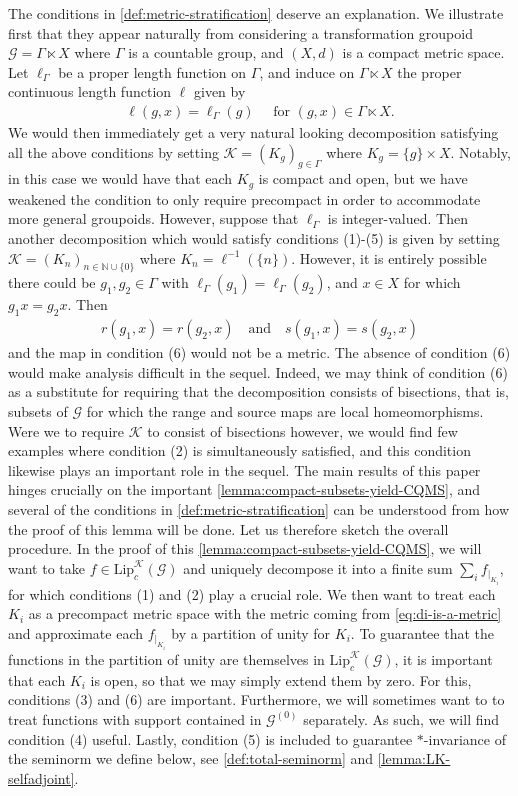 \documentclass[11pt,a4paper,oneside,final,reqno]{amsart}
\theoremstyle{definition}
\newcommand{\G}{\mathcal{G}}
\newcommand{\Go}{\mathcal{G}^{(0)}}
\newcommand{\cK}{\mathcal{K}}
\newcommand{\Lip}{\mathrm{Lip}}
\newcommand{\N}{\mathbb{N}}
\numberwithin{equation}{section}
\begin{document}
	The conditions in \cref{def:metric-stratification} deserve an explanation. We illustrate first that they appear naturally from considering a transformation groupoid 
	$\G = \Gamma \ltimes X$ 
	where $\Gamma$ is a countable group, and $(X,d)$ is a compact metric space. Let $\ell_\Gamma$ be a proper length function on $\Gamma$, and induce on  
	$\Gamma \ltimes X$ 
	the proper continuous length function $\ell$ given by 
	\begin{align}\label{eq:length-function-transformation-groupoid}
			\ell(g,x) = \ell_\Gamma (g) \quad \text{ for $(g,x) \in \Gamma \ltimes X$.}
	\end{align}
	We would then immediately get a very natural looking decomposition satisfying all the above conditions by setting $\cK = (K_g)_{g\in \Gamma}$ where 
	$K_g =  \{g\} \times X$. 
	Notably, in this case we would have that each $K_g$ is compact and open, but we have weakened the condition to only require precompact in order to accommodate more general groupoids. 
	However, suppose that $\ell_\Gamma$ is integer-valued. Then another decomposition which would satisfy conditions (1)-(5) is given by setting $\cK = (K_n)_{n \in \N\cup \{0\}}$ where $K_n = \ell^{-1}(\{n\})$. However, it is entirely possible there could be $g_1, g_2 \in \Gamma$ with $\ell_\Gamma (g_1) = \ell_\Gamma(g_2)$, and $x \in X$ for which $g_1 x = g_2 x$. Then
	\begin{align*}
		r(g_1,x) = r(g_2,x) \quad \text{and} \quad s(g_1,x) = s(g_2,x)
	\end{align*}
	and the map in condition (6) would not be a metric. The absence of condition (6) would make analysis difficult in the sequel. 
	Indeed, we may think of condition (6) as a substitute for requiring that the decomposition consists of bisections, that is, subsets of $\G$ for which the range and source maps are local homeomorphisms. Were we to require $\cK$ to consist of bisections however, we would find few examples where condition (2) is simultaneously satisfied, and this condition likewise plays an important role in the sequel.  
	The main results of this paper hinges crucially on the important \cref{lemma:compact-subsets-yield-CQMS}, and several of the conditions in \cref{def:metric-stratification} can be understood from how the proof of this lemma will be done. Let us therefore sketch the overall procedure. 
	In the proof of this \cref{lemma:compact-subsets-yield-CQMS}, we will want to take $f \in \Lip_c^{\cK}(\G)$ and uniquely decompose it into a finite sum $\sum_i f_{\vert_{K_i}}$, for which conditions (1) and (2) play a crucial role. 
	We then want to treat each $K_i$ as a precompact metric space with the metric coming from \eqref{eq:di-is-a-metric} and approximate each $f_{\vert_{K_i}}$ by a partition of unity for $K_i$. To guarantee that the functions in the partition of unity are themselves in $\Lip_c^{\cK}(\G)$, it is important that each $K_i$ is open, so that we may simply extend them by zero. For this, conditions (3) and (6) are important. Furthermore, 
	we will
	sometimes 
	want to
	to treat functions with support contained in $\Go$ separately.
	As such, we will find condition (4) useful. 
	Lastly, condition (5) is included to guarantee $*$-invariance of the seminorm we define below, see \cref{def:total-seminorm} and \cref{lemma:LK-selfadjoint}. 
	
\end{document}
